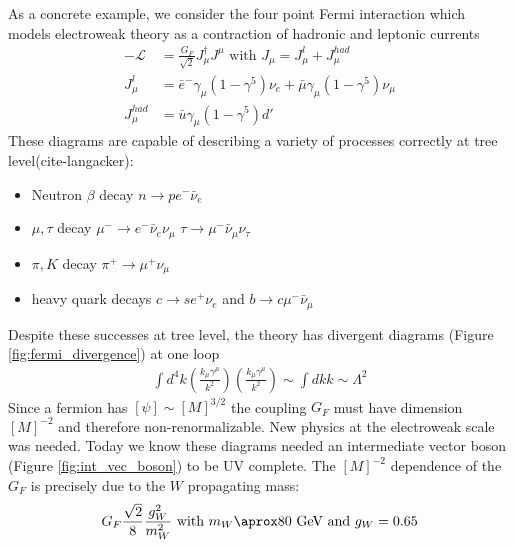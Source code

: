As a concrete example, we consider the four point Fermi interaction which models electroweak theory as a contraction
 of hadronic and leptonic currents 
\begin{align*}
-\mathcal{L}  &= \frac{G_F}{\sqrt{2}} J^\dagger_\mu J^\mu  \text{ with } J_\mu = J^l_\mu + J^{had}_\mu\\
J_\mu^l &= \bar{e}^- \gamma_\mu (1- \gamma^5) \nu_e + \bar{\mu} \gamma_\mu (1- \gamma^5) \nu_\mu \\
J_\mu^{had} &= \bar{u} \gamma_\mu (1- \gamma^5) d'
\end{align*}
These diagrams are capable of describing a variety of processes correctly at tree level(cite-langacker):
\begin{itemize}
\item Neutron $\beta$ decay $n\rightarrow p e^-\bar{\nu}_e$
\item $\mu,\tau$ decay $\mu^- \rightarrow e^- \bar{\nu}_e \nu_\mu$ $\tau\rightarrow \mu^- \bar{\nu}_\mu \nu_\tau$ 
\item $\pi,K$ decay $\pi^+ \rightarrow \mu^+ \nu_\mu$ 
\item heavy quark decays $c \rightarrow s e^+ \nu_e$ and  $b \rightarrow c \mu^- \bar{\nu}_\mu$ 
\end{itemize}
Despite these successes at tree level, the theory has divergent diagrams (Figure \ref{fig:fermi_divergence}) at one loop
\begin{align*}
\int d^4k \left ( \frac{k_\mu \gamma^\mu}{k^2} \right ) \left ( \frac{k_\mu \gamma^\mu}{k^2} \right ) \sim \int dk k  \sim \Lambda^2 
\end{align*}
Since a fermion has $[\psi] \sim [M]^{3/2}$ the coupling $G_F$ must have dimension $[M]^{-2}$ and therefore
non-renormalizable. New physics at the electroweak scale was needed. Today we know these diagrams needed an 
 intermediate vector boson (Figure \ref{fig:int_vec_boson}) to be UV complete. The $[M]^{-2}$ dependence
of the $G_F$ is precisely due to the $W$ propagating mass:
\begin{align*}
G_F \frac{\sqrt{2}}{8} \frac{g_W^2}{m_W^2} \text{ with } m_W\aprox 80 \text{ GeV and } g_W = 0.65
\end{align*}

